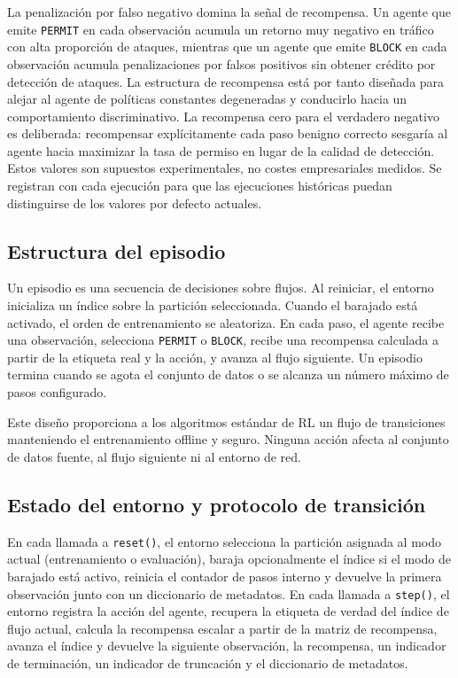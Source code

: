 La penalización por falso negativo domina la señal de recompensa. Un agente que emite \texttt{PERMIT} en cada observación acumula un retorno muy negativo en tráfico con alta proporción de ataques, mientras que un agente que emite \texttt{BLOCK} en cada observación acumula penalizaciones por falsos positivos sin obtener crédito por detección de ataques. La estructura de recompensa está por tanto diseñada para alejar al agente de políticas constantes degeneradas y conducirlo hacia un comportamiento discriminativo. La recompensa cero para el verdadero negativo es deliberada: recompensar explícitamente cada paso benigno correcto sesgaría al agente hacia maximizar la tasa de permiso en lugar de la calidad de detección. Estos valores son supuestos experimentales, no costes empresariales medidos. Se registran con cada ejecución para que las ejecuciones históricas puedan distinguirse de los valores por defecto actuales.

\subsection{Estructura del episodio}
Un episodio es una secuencia de decisiones sobre flujos. Al reiniciar, el entorno inicializa un índice sobre la partición seleccionada. Cuando el barajado está activado, el orden de entrenamiento se aleatoriza. En cada paso, el agente recibe una observación, selecciona \texttt{PERMIT} o \texttt{BLOCK}, recibe una recompensa calculada a partir de la etiqueta real y la acción, y avanza al flujo siguiente. Un episodio termina cuando se agota el conjunto de datos o se alcanza un número máximo de pasos configurado.

Este diseño proporciona a los algoritmos estándar de RL un flujo de transiciones manteniendo el entrenamiento offline y seguro. Ninguna acción afecta al conjunto de datos fuente, al flujo siguiente ni al entorno de red.

\subsection{Estado del entorno y protocolo de transición}
En cada llamada a \texttt{reset()}, el entorno selecciona la partición asignada al modo actual (entrenamiento o evaluación), baraja opcionalmente el índice si el modo de barajado está activo, reinicia el contador de pasos interno y devuelve la primera observación junto con un diccionario de metadatos. En cada llamada a \texttt{step()}, el entorno registra la acción del agente, recupera la etiqueta de verdad del índice de flujo actual, calcula la recompensa escalar a partir de la matriz de recompensa, avanza el índice y devuelve la siguiente observación, la recompensa, un indicador de terminación, un indicador de truncación y el diccionario de metadatos.

